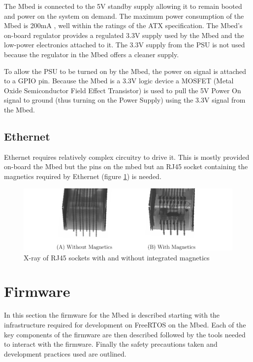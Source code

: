 			The Mbed is connected to the 5V standby supply allowing it to remain
			booted and power on the system on demand. The maximum power consumption
			of the Mbed is 200mA \cite{mbed}, well within the ratings of the ATX
			specification. The Mbed's on-board regulator provides a regulated 3.3V
			supply used by the Mbed and the low-power electronics attached to it.
			The 3.3V supply from the PSU is not used because the regulator in the
			Mbed offers a cleaner supply.
			
			To allow the PSU to be turned on by the Mbed, the power on signal is
			attached to a GPIO pin.  Because the Mbed is a 3.3V logic device a
			MOSFET (Metal Oxide Semiconductor Field Effect Transistor) is used to
			pull the 5V Power On signal to ground (thus turning on the Power Supply)
			using the 3.3V signal from the Mbed.
		
		\subsection{Ethernet}
			
			Ethernet requires relatively complex circuitry to drive it. This is mostly
			provided on-board the Mbed but the pins on the mbed but an RJ45 socket
			containing the magnetics required by Ethernet (figure
			\ref{fig:jackMagnetics}) is needed.
			
			\begin{figure}
				\includegraphics[width=1\textwidth]{diagrams/jackMagnetics.pdf}
				\caption{X-ray of RJ45 sockets with and without integrated magnetics
				         \cite{raspimag}}
				\label{fig:jackMagnetics}
			\end{figure}
	
	\section{Firmware}
		
		In this section the firmware for the Mbed is described starting with the
		infrastructure required for development on FreeRTOS on the Mbed. Each of the
		key components of the firmware are then described followed by the tools
		needed to interact with the firmware. Finally the safety precautions taken
		and development practices used are outlined.
		
